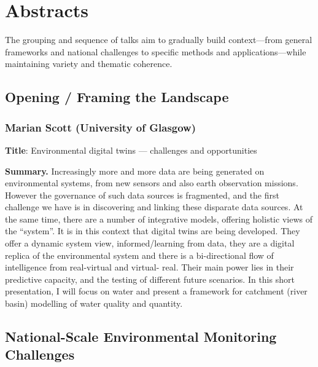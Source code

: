 \documentclass[
  11pt,
  letterpaper,
  DIV=11,
  numbers=noendperiod]{scrartcl}
\begin{document}
\newpage

\section{Abstracts}\label{abstracts}

The grouping and sequence of talks aim to gradually build context---from
general frameworks and national challenges to specific methods and
applications---while maintaining variety and thematic coherence.

\subsection{Opening / Framing the
Landscape}\label{opening-framing-the-landscape}

\subsubsection[\textbf{Marian Scott} (University of Glasgow) \\Environmental digital twins — challenges and opportunities]{Marian Scott (University of Glasgow)}

\textbf{Title}: Environmental digital twins --- challenges and
opportunities

\textbf{Summary.} Increasingly more and more data are being generated on
environmental systems, from new sensors and also earth observation
missions. However the governance of such data sources is fragmented, and
the first challenge we have is in discovering and linking these
disparate data sources. At the same time, there are a number of
integrative models, offering holistic views of the ``system''. It is in
this context that digital twins are being developed. They offer a
dynamic system view, informed/learning from data, they are a digital
replica of the environmental system and there is a bi-directional flow
of intelligence from real-virtual and virtual- real. Their main power
lies in their predictive capacity, and the testing of different future
scenarios. In this short presentation, I will focus on water and present
a framework for catchment (river basin) modelling of water quality and
quantity.

\subsection{National-Scale Environmental Monitoring
Challenges}\label{national-scale-environmental-monitoring-challenges}
\end{document}
